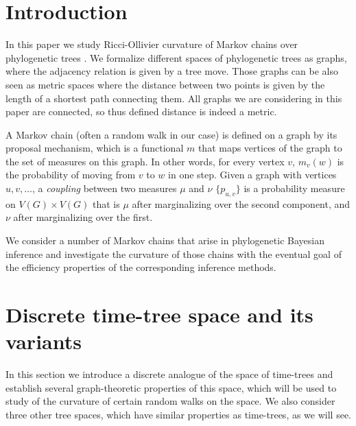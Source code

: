 \documentclass{amsart}
\begin{document}
\section{Introduction}

In this paper we study Ricci-Ollivier curvature of Markov chains over phylogenetic trees \cite{Ollivier2009-cj}.
We formalize different spaces of phylogenetic trees as graphs, where the adjacency
relation is given by a tree move. Those graphs can be also seen as metric
spaces where the distance between two points is given by the length of a
shortest path connecting them. All graphs we are considering in this paper are
connected, so thus defined distance is indeed a metric.

A Markov chain (often a random walk in our case) is defined on a graph by its
proposal mechanism, which is a functional $m$ that maps vertices of the graph to
the set of measures on this graph. In other words, for every vertex $v$,
$m_v(w)$ is the probability of moving from $v$ to $w$ in one step.
Given a graph with vertices ${u, v, \ldots}$, a \emph{coupling} between two measures $\mu$ and $\nu$ $\{p_{u,v}\}$ is a probability measure on $V(G) \times V(G)$ that is $\mu$ after marginalizing over the second component, and $\nu$ after marginalizing over the first.

We consider a number of Markov chains that arise
in phylogenetic Bayesian
inference and investigate the curvature of those chains with the eventual goal of
the efficiency properties of the corresponding inference methods.

\section{Discrete time-tree space and its variants}

In this section we introduce a discrete analogue of the space of time-trees and establish several graph-theoretic properties of this space, which will be used to study of the curvature of certain random walks on the space.
We also consider three other tree spaces, which have similar properties as time-trees, as we will see.
\end{document}
